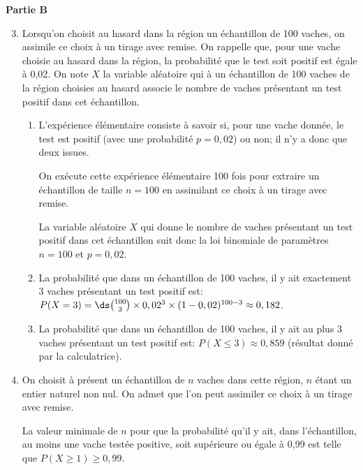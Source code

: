 \medskip

\textbf{Partie B}



\begin{enumerate}
\setcounter{enumi}{2}
	\item Lorsqu'on choisit au hasard dans la région un échantillon de 100 vaches, on assimile ce choix à un tirage avec remise.	
On rappelle que, pour une vache choisie au hasard dans la région, la probabilité que le test soit positif est égale à 0,02.
On note $X$ la variable aléatoire qui à un échantillon de 100 vaches de la région choisies au hasard associe le nombre de vaches présentant un test positif dans cet échantillon.

	\begin{enumerate}
		\item 
L'expérience élémentaire consiste à savoir si, pour une vache donnée, le test est positif (avec une probabilité $p=0,02$) ou non; il n'y a donc que deux issues.

On exécute cette expérience élémentaire 100 fois pour extraire un échantillon de taille $n=100$ en assimilant ce choix à un tirage avec remise.

La variable aléatoire $X$ qui donne  le nombre de vaches présentant un test positif dans cet échantillon suit donc la loi binomiale de paramètres $n=100$ et $p=0,02$.

		\item La probabilité que dans un échantillon de 100 vaches, il y ait exactement 3 vaches présentant un test positif est:	
$P(X=3) = \ds\binom{100}{3}\times 0,02^{3}\times (1-0,02)^{100-3}
\approx 0,182$.
				


		\item La probabilité que dans un échantillon de 100 vaches, il y ait au plus 3 vaches présentant un test positif est:		
$P(X\leqslant 3)\approx 0,859$ (résultat donné par la calculatrice).		
		



	\end{enumerate}

	\item On choisit à présent un échantillon de $n$ vaches dans cette région, $n$ étant un entier naturel non nul. On admet que l'on peut assimiler ce choix à un tirage avec remise.

La valeur minimale de $n$ pour que la probabilité qu'il y ait, dans l'échantillon, au moins une vache testée positive, soit supérieure ou égale à 0,99 est telle que
$P(X\geqslant 1) \geqslant 0,99$.


\end{enumerate}
